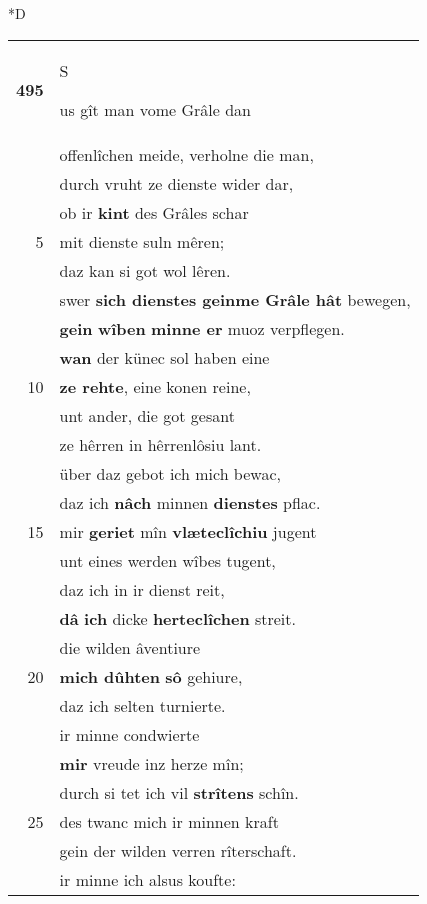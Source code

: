 \documentclass[8pt,a4paper,notitlepage]{article}
\begin{document}
\begin{table}[ht]
\begin{minipage}[t]{0.5\linewidth}
\small
\begin{center}*D
\end{center}
\begin{tabular}{rl}
\textbf{495} & \begin{large}S\end{large}us gît man vome Grâle dan\\ 
 & offenlîchen meide, verholne die man,\\ 
 & durch vruht ze dienste wider dar,\\ 
 & ob ir \textbf{kint} des Grâles schar\\ 
5 & mit dienste suln mêren;\\ 
 & daz kan si got wol lêren.\\ 
 & swer \textbf{sich dienstes geinme Grâle hât} bewegen,\\ 
 & \textbf{gein} \textbf{wîben} \textbf{minne er} muoz verpflegen.\\ 
 & \textbf{wan} der künec sol haben eine\\ 
10 & \textbf{ze rehte}, eine konen reine,\\ 
 & unt ander, die got gesant\\ 
 & ze hêrren in hêrrenlôsiu lant.\\ 
 & über daz gebot ich mich bewac,\\ 
 & daz ich \textbf{nâch} minnen \textbf{dienstes} pflac.\\ 
15 & mir \textbf{geriet} mîn \textbf{vlæteclîchiu} jugent\\ 
 & unt eines werden wîbes tugent,\\ 
 & daz ich in ir dienst reit,\\ 
 & \textbf{dâ} \textbf{ich} dicke \textbf{herteclîchen} streit.\\ 
 & die wilden âventiure\\ 
20 & \textbf{mich dûhten} \textbf{sô} gehiure,\\ 
 & daz ich selten turnierte.\\ 
 & ir minne condwierte\\ 
 & \textbf{mir} vreude inz herze mîn;\\ 
 & durch si tet ich vil \textbf{strîtens} schîn.\\ 
25 & des twanc mich ir minnen kraft\\ 
 & gein der wilden verren rîterschaft.\\ 
 & ir minne ich alsus koufte:\\ 

\end{tabular}
\end{minipage}
\end{table}
\end{document}

